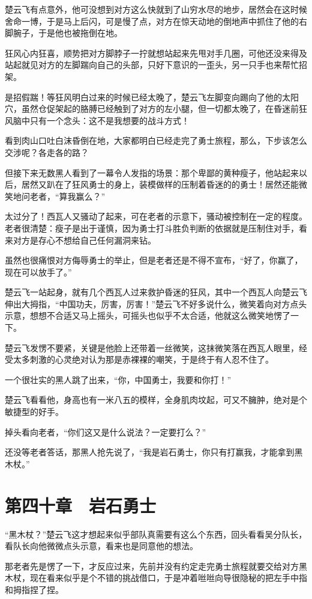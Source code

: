 楚云飞有点意外，他可没想到对方这么快就到了山穷水尽的地步，居然会在这时候舍命一博，于是马上后闪，可是慢了点，对方在惊天动地的倒地声中抓住了他的右脚腕子，于是他也被拖倒在地。

狂风心内狂喜，顺势把对方脚脖子一拧就想站起来先甩对手几圈，可他还没来得及站起就见对方的左脚踹向自己的头部，只好下意识的一歪头，另一只手也来帮忙招架。

是招假踹！等狂风明白过来的时候已经太晚了，楚云飞左脚变向踢向了他的太阳穴，虽然仓促架起的胳膊已经触到了对方的左小腿，但一切都太晚了，在昏迷前狂风脑中只有一个念头：这不是我想要的战斗方式！

看到肉山口吐白沫昏倒在地，大家都明白已经走完了勇士旅程，那么，下步该怎么交涉呢？各走各的路？

但接下来无数黑人看到了一幕令人发指的场景：那个卑鄙的黄种瘦子，他站起来以后，居然又趴在了狂风勇士的身上，装模做样的压制着昏迷的的勇士！居然还能微笑地问老者，“算我赢么？”

太过分了！西瓦人又骚动了起来，可在老者的示意下，骚动被控制在一定的程度。老者很清楚：瘦子是出于谨慎，因为勇士打斗胜负判断的依据就是压制住对手，看来对方是存心不想给自己任何漏洞来钻。

虽然也很痛恨对方侮辱勇士的举止，但是老者还是不得不宣布，“好了，你赢了，现在可以放手了。”

楚云飞一站起身，就有几个西瓦人过来救护昏迷的狂风，其中一个西瓦人向楚云飞伸出大拇指，“中国功夫，厉害，厉害！”楚云飞不好多说什么，微笑着向对方点头示意，想想不合适又马上摇头，可摇头也似乎不太合适，他就这么微笑地愣了一下。

楚云飞发愣不要紧，关键是他脸上还带着一丝微笑，这抹微笑落在西瓦人眼里，经受太多刺激的心灵绝对认为那是赤裸裸的嘲笑，于是终于有人忍不住了。

一个很壮实的黑人跳了出来，“你，中国勇士，我要和你打！”

楚云飞看看他，身高也有一米八五的模样，全身肌肉坟起，可又不臃肿，绝对是个敏捷型的好手。

掉头看向老者，“你们这又是什么说法？一定要打么？”

还没等老者答话，那黑人抢先说了，“我是岩石勇士，你只有打赢我，才能拿到黑木杖。”

\section{第四十章　岩石勇士}

“黑木杖？”楚云飞这才想起来似乎部队真需要有这么个东西，回头看看吴分队长，看队长向他微微点头示意，看来也是同意他的想法。

那老者先是愣了一下，才反应过来，先前并没有约定走完勇士旅程就要交给对方黑木杖，现在看来似乎是个不错的挑战借口，于是冲着咝咝向导很隐秘的把左手中指和拇指捏了捏。

